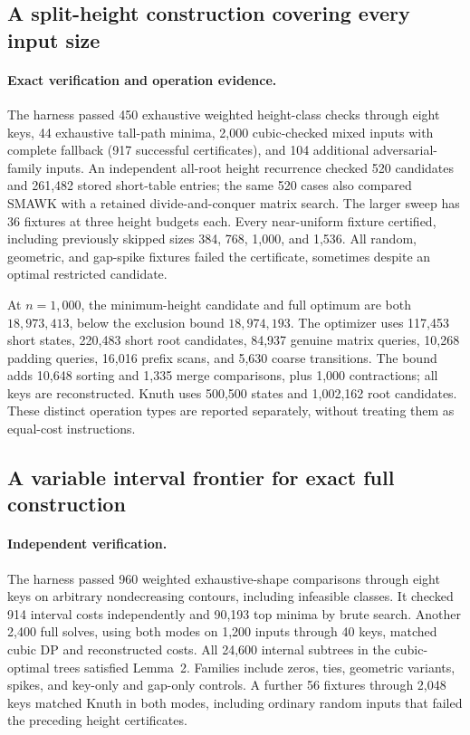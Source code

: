 \documentclass[11pt]{article}
\begin{document}
\subsection{A split-height construction covering every input size}
\paragraph{Exact verification and operation evidence.}
The harness passed 450 exhaustive weighted height-class checks through
eight keys, 44 exhaustive tall-path minima, 2,000 cubic-checked mixed inputs
with complete fallback (917 successful certificates), and 104 additional
adversarial-family inputs. An independent all-root height recurrence checked
520 candidates and 261,482 stored short-table entries; the same 520 cases
also compared SMAWK with a retained divide-and-conquer matrix search.
The larger sweep has 36 fixtures at three height budgets each. Every
near-uniform fixture certified, including previously skipped sizes
384, 768, 1,000, and 1,536. All random, geometric, and gap-spike fixtures
failed the certificate, sometimes despite an optimal restricted candidate.

At $n=1{,}000$, the minimum-height candidate and full optimum are both
$18{,}973{,}413$, below the exclusion bound $18{,}974{,}193$. The optimizer
uses 117,453 short states, 220,483 short root candidates, 84,937 genuine
matrix queries, 10,268 padding queries, 16,016 prefix scans, and 5,630 coarse
transitions. The bound adds 10,648 sorting and 1,335 merge comparisons,
plus 1,000 contractions; all keys are reconstructed. Knuth uses 500,500
states and 1,002,162 root candidates. These distinct operation types are
reported separately, without treating them as equal-cost instructions.


\subsection{A variable interval frontier for exact full construction}
\paragraph{Independent verification.}
The harness passed 960 weighted exhaustive-shape comparisons through
eight keys on arbitrary nondecreasing contours, including infeasible
classes. It checked 914 interval costs independently and 90,193 top
minima by brute search. Another 2,400 full solves, using both modes on
1,200 inputs through 40 keys, matched cubic DP and reconstructed costs.
All 24,600 internal subtrees in the cubic-optimal trees satisfied
Lemma~2. Families include zeros, ties, geometric variants,
spikes, and key-only and gap-only controls. A further 56 fixtures through
2,048 keys matched Knuth in both modes, including ordinary random inputs
that failed the preceding height certificates.
\end{document}
